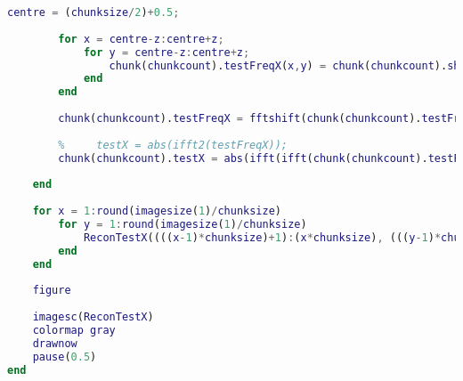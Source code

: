 \begin{lstlisting}[language=Matlab, label = lst:chunk_comp, caption = {Secioned image, transform based compression code}]
        centre = (chunksize/2)+0.5;
        
        for x = centre-z:centre+z;
            for y = centre-z:centre+z;
                chunk(chunkcount).testFreqX(x,y) = chunk(chunkcount).shiftedFreqX(x,y);
            end
        end
        
        chunk(chunkcount).testFreqX = fftshift(chunk(chunkcount).testFreqX);
        
        %     testX = abs(ifft2(testFreqX));
        chunk(chunkcount).testX = abs(ifft(ifft(chunk(chunkcount).testFreqX)')');
        
    end
    
    for x = 1:round(imagesize(1)/chunksize)
        for y = 1:round(imagesize(1)/chunksize)
            ReconTestX((((x-1)*chunksize)+1):(x*chunksize), (((y-1)*chunksize)+1):(y*chunksize)) = chunk(x,y).testX;
        end
    end
    
    figure
    
    imagesc(ReconTestX)
    colormap gray
    drawnow
    pause(0.5)
end
\end{lstlisting}